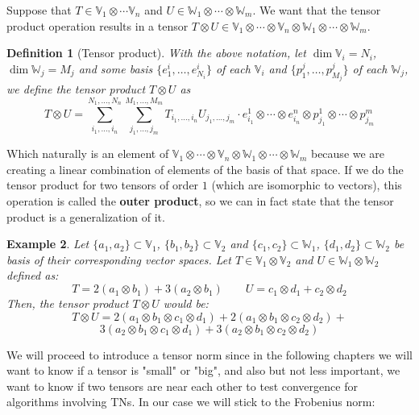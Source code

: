 \documentclass[11pt,a4paper,openright,oneside]{book}
\numberwithin{equation}{section}
\newtheorem{defn0}{Definition}[chapter]
\newtheorem{example0}[defn0]{Example}
\newenvironment{definition}{ \begin{defn0}}{\end{defn0}}
\newenvironment{example}{ \begin{example0}\rm}{\end{example0}}
\begin{document}
Suppose that
$T \in \mathbb{V}_1 \otimes \cdots \mathbb{V}_n$ and $U \in \mathbb{W}_1 \otimes \cdots \otimes \mathbb{W}_m$. We want 
that the tensor product
operation results in a tensor $T \otimes U \in \mathbb{V}_1 \otimes \cdots \otimes \mathbb{V}_n \otimes \mathbb{W}_1 \otimes \cdots \otimes \mathbb{W}_m$.

\begin{definition}[Tensor product] With the above notation, let $\dim \mathbb{V}_i = N_i$, $\dim \mathbb{W}_j = M_j$
    and some basis $\{e_1^i, \dots, e_{N_i}^i\}$ of each $\mathbb{V}_i$ and $\{p_1^j, \dots, p_{M_j}^j\}$ of each $\mathbb{W}_j$,
    we define the tensor product
    $T \otimes U$ as
    \begin{equation}
        T \otimes U = \sum_{i_1, \dots, i_n}^{N_1, \dots, N_n} \sum_{j_1, \dots, j_m}^{M_1, \dots, M_m} T_{i_1, \dots, i_n} U_{j_1, \dots, j_m} \cdot
    e_{i_1}^1 \otimes \cdots \otimes e_{i_n}^n \otimes p_{j_1}^1 \otimes \cdots \otimes p_{j_m}^m
    \label{eq:tensor_product}
\end{equation}
\end{definition}

Which naturally is an element of $\mathbb{V}_1 \otimes \cdots \otimes \mathbb{V}_n \otimes \mathbb{W}_1 \otimes \cdots \otimes \mathbb{W}_m$
because we are creating a linear combination of elements of the basis of that space.
If we do the tensor product for two tensors of order $1$ (which are isomorphic to vectors), this operation is called the \textbf{outer product},
so we can in fact state that the tensor product is a generalization of it.

\begin{example}
    Let $\{a_1, a_2\} \subset \mathbb{V}_1$, $\{b_1, b_2\} \subset \mathbb{V}_2$ and $\{c_1, c_2\} \subset \mathbb{W}_1$, $\{d_1, d_2\} \subset \mathbb{W}_2$ be basis
    of their corresponding vector spaces. Let $T \in \mathbb{V}_1 \otimes \mathbb{V}_2$ and $U \in \mathbb{W}_1 \otimes \mathbb{W}_2$ defined as:
    $$T = 2 (a_1 \otimes b_1) + 3 (a_2 \otimes b_1) \qquad U = c_1 \otimes d_1 + c_2 \otimes d_2$$
    Then, the tensor product $T \otimes U$ would be:
    $$T \otimes U = 2 (a_1 \otimes b_1 \otimes c_1 \otimes d_1) + 2 (a_1 \otimes b_1 \otimes c_2 \otimes d_2) + $$$$
    3 (a_2 \otimes b_1 \otimes c_1 \otimes d_1) + 3 (a_2 \otimes b_1 \otimes c_2 \otimes d_2)$$
\end{example}

We will proceed to introduce a tensor norm since in the following chapters we will want to know if
a tensor is "small" or "big", and also but not less important, we want to know if two tensors are near each other
to test convergence for algorithms involving \gls{TN}s. In our case we will stick to the Frobenius norm:
\end{document}
